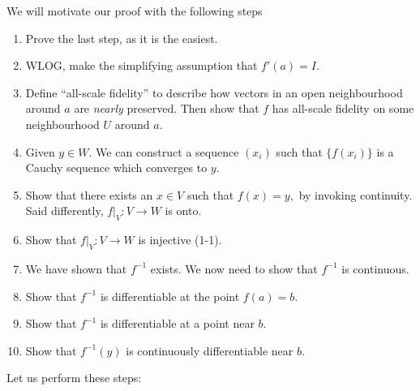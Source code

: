 \documentclass{article}
\begin{document}
We will motivate our proof with the following steps
\begin{enumerate}
    \item Prove the last step, as it is the easiest.
    \item WLOG, make the simplifying assumption that $f'(a) = I$.
    \item Define ``all-scale fidelity'' to describe how vectors in an open neighbourhood around $a$ are \textit{nearly} preserved. Then show that $f$ has all-scale fidelity on some neighbourhood $U$ around $a$.
    \item Given $y\in W$. We can construct a sequence $(x_i)$ such that $\{f(x_i)\}$ is a Cauchy sequence which converges to $y.$
    \item Show that there exists an $x\in V$ such that $f(x)=y,$ by invoking continuity. Said differently, $f|_V: V\rightarrow W$ is onto.
    \item Show that $f|_V: V\rightarrow W$ is injective (1-1).
    \item We have shown that $f^{-1}$ exists. We now need to show that $f^{-1}$ is continuous.
    \item Show that $f^{-1}$ is differentiable at the point $f(a)=b$.
    \item Show that $f^{-1}$ is differentiable at a point near $b$.
    \item Show that $f^{-1}(y)$ is continuously differentiable near $b$.
\end{enumerate}
Let us perform these steps:
\end{document}
